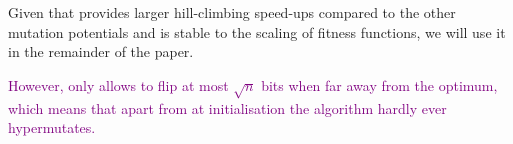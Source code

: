 \documentclass[lettersize,journal]{IEEEtran}
\begin{document}






Given that {\expoHD } provides larger hill-climbing speed-ups compared to the other mutation potentials and is stable to the scaling of fitness functions,
we will use it in the remainder of the paper.

\textcolor{purple}{However, {\expoHD } only allows to flip at most $\sqrt{n}$ bits when far away from the optimum, which means that apart from at initialisation the algorithm hardly ever hypermutates.}

 	
\end{document}

